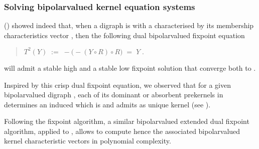 \documentclass[a4paper,10pt,english]{sphinxhowto}
\begin{document}
\subsubsection{Solving bipolar\sphinxhyphen{}valued kernel equation systems}
\label{\detokenize{tutorial:solving-bipolar-valued-kernel-equation-systems}}
 () showed indeed that, when a digraph  is  with a    characterised by its membership characteristics vector , then the following dual bipolar\sphinxhyphen{}valued fixpoint equation
\begin{quote}

\(T^2(Y) \; := \; -\big( -(Y \circ R) \circ R) \; = \; Y\;.\)
\end{quote}

will admit a stable high and a stable low fixpoint solution that converge both to .

Inspired by this crisp dual fixpoint equation, we observed that for a given bipolar\sphinxhyphen{}valued digraph , each of its dominant or absorbent prekernels  in  determines an induced   which is  and admits  as unique kernel (see ).

Following the  fixpoint algorithm, a similar bipolar\sphinxhyphen{}valued extended dual fixpoint algorithm, applied to , allows to compute hence the associated bipolar\sphinxhyphen{}valued kernel characteristic vectors  in polynomial complexity.
\end{document}
